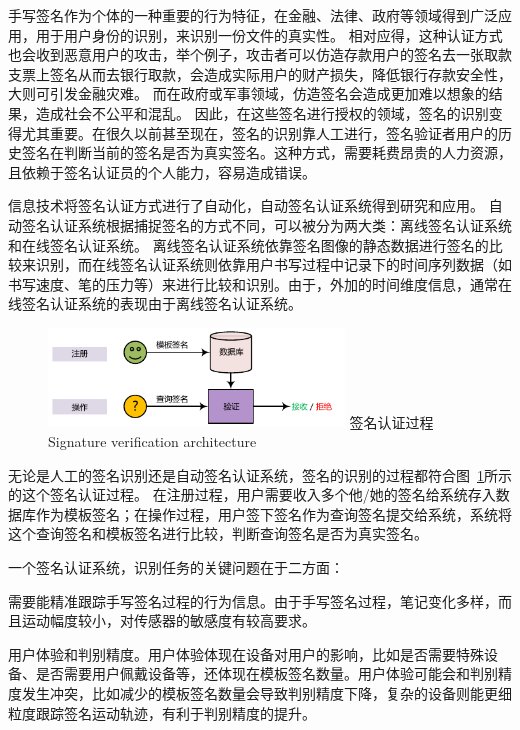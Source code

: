 手写签名作为个体的一种重要的行为特征，在金融、法律、政府等领域得到广泛应用，用于用户身份的识别，来识别一份文件的真实性。 相对应得，这种认证方式也会收到恶意用户的攻击，举个例子，攻击者可以仿造存款用户的签名去一张取款支票上签名从而去银行取款，会造成实际用户的财产损失，降低银行存款安全性，大则可引发金融灾难。 而在政府或军事领域，仿造签名会造成更加难以想象的结果，造成社会不公平和混乱。 因此，在这些签名进行授权的领域，签名的识别变得尤其重要。在很久以前甚至现在，签名的识别靠人工进行，签名验证者用户的历史签名在判断当前的签名是否为真实签名。这种方式，需要耗费昂贵的人力资源，且依赖于签名认证员的个人能力，容易造成错误。

信息技术将签名认证方式进行了自动化，自动签名认证系统得到研究和应用。 自动签名认证系统根据捕捉签名的方式不同，可以被分为两大类：离线签名认证系统和在线签名认证系统。 离线签名认证系统依靠签名图像的静态数据进行签名的比较来识别，而在线签名认证系统则依靠用户书写过程中记录下的时间序列数据（如书写速度、笔的压力等）来进行比较和识别。由于，外加的时间维度信息，通常在线签名认证系统的表现由于离线签名认证系统。

\begin{figure}[!htp]
  \centering
  \includegraphics[width=0.7\textwidth]{figure/verification-work-flow.pdf}
  \bicaption
    {签名认证过程}
    {Signature verification architecture}
  \label{fig:signature-verification-architecture}
\end{figure}

无论是人工的签名识别还是自动签名认证系统，签名的识别的过程都符合图~\ref{fig:signature-verification-architecture}所示的这个签名认证过程。 在注册过程，用户需要收入多个他/她的签名给系统存入数据库作为模板签名；在操作过程，用户签下签名作为查询签名提交给系统，系统将这个查询签名和模板签名进行比较，判断查询签名是否为真实签名。

一个签名认证系统，识别任务的关键问题在于二方面：
\begin{enumerate*}[label=\itshape\alph*)\upshape]
    \item 需要能精准跟踪手写签名过程的行为信息。由于手写签名过程，笔记变化多样，而且运动幅度较小，对传感器的敏感度有较高要求。
    \item 用户体验和判别精度。用户体验体现在设备对用户的影响，比如是否需要特殊设备、是否需要用户佩戴设备等，还体现在模板签名数量。用户体验可能会和判别精度发生冲突，比如减少的模板签名数量会导致判别精度下降，复杂的设备则能更细粒度跟踪签名运动轨迹，有利于判别精度的提升。
\end{enumerate*}

